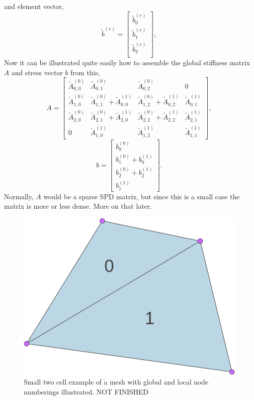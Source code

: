 and element vector,
\begin{equation}\label{elemvec}
	\widetilde{b}^{(e)} =
	\left[\begin{matrix}
		\widetilde{b}^{(e)}_0 \\
		\widetilde{b}^{(e)}_1 \\
		\widetilde{b}^{(e)}_2 \\
	\end{matrix}\right],
\end{equation}
Now it can be illustrated quite easily how to assemble the global stiffness matrix $A$ and stress vector $b$ from this,
\begin{equation}
	A =
	\left[\begin{matrix} 
		\widetilde{A}^{(0)}_{0,0} & \widetilde{A}^{(0)}_{0,1} & \widetilde{A}^{(0)}_{0,2} & 0 \\
		\widetilde{A}^{(0)}_{1,0} & \widetilde{A}^{(0)}_{1,1} + \widetilde{A}^{(1)}_{0,0}  & \widetilde{A}^{(0)}_{1,2} + \widetilde{A}^{(1)}_{0,2} & \widetilde{A}^{(1)}_{0,1} \\
		\widetilde{A}^{(0)}_{2,0} & \widetilde{A}^{(0)}_{2,1} + \widetilde{A}^{(1)}_{2,0} & \widetilde{A}^{(0)}_{2,2} + \widetilde{A}^{(1)}_{2,2} & \widetilde{A}^{(1)}_{2,1} \\
		0 & \widetilde{A}^{(1)}_{1,0} & \widetilde{A}^{(1)}_{1,2} & \widetilde{A}^{(1)}_{1,1}
	\end{matrix}\right],
\end{equation}
\begin{equation}
	b =
	\left[\begin{matrix}
		b^{(0)}_0 \\
		b^{(0)}_1 + b^{(1)}_0 \\
		b^{(0)}_2 + b^{(1)}_2 \\
		b^{(1)}_1
	\end{matrix}\right].
\end{equation}
Normally, $A$ would be a sparse SPD matrix, but since this is a small case the matrix is more or less dense. More on that later.
\begin{figure}
	\centering
	\includegraphics[width = 0.35\linewidth]{Figures/2cell.png}
	\caption{Small two cell example of a mesh with global and local node numberings illustrated. NOT FINISHED}
	\label{fig:2cell}
\end{figure}
